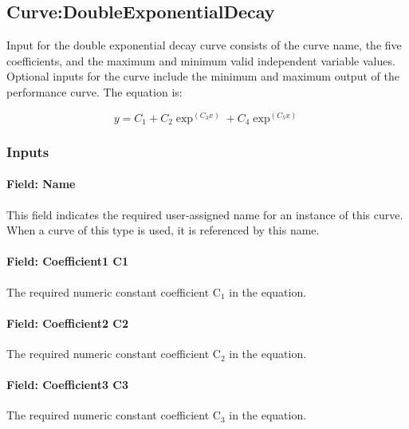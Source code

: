 \subsection{Curve:DoubleExponentialDecay}\label{curvedoubleexponentialdecay}

Input for the double exponential decay curve consists of the curve name, the five coefficients, and the maximum and minimum valid independent variable values. Optional inputs for the curve include the minimum and maximum output of the performance curve. The equation is:

\begin{equation}
y = {C_1} + {C_2}{\exp ^{({C_3}x)}} + {C_4}{\exp ^{({C_5}x)}}
\end{equation}

\subsubsection{Inputs}\label{inputs-18-005}

\paragraph{Field: Name}\label{field-name-18-004}

This field indicates the required user-assigned name for an instance of this curve. When a curve of this type is used, it is referenced by this name.

\paragraph{Field: Coefficient1 C1}\label{field-coefficient1-c1-5}

The required numeric constant coefficient C\(_{1}\) in the equation.

\paragraph{Field: Coefficient2 C2}\label{field-coefficient2-c2-5}

The required numeric constant coefficient C\(_{2}\) in the equation.

\paragraph{Field: Coefficient3 C3}\label{field-coefficient3-c3-5}

The required numeric constant coefficient C\(_{3}\) in the equation.

